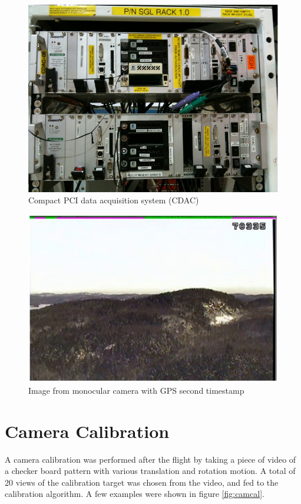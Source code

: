 \begin{figure}[h]
  \centering
  \includegraphics[width=12cm,keepaspectratio=true]{./Figures/CDAC_Rack.jpg}
  \caption{Compact PCI data acquisition system (CDAC)}
  \label{fig:CDAC}
\end{figure}

\begin{figure}[h]
  \centering
  \includegraphics[width=12cm,keepaspectratio=true]{./Figures/video_snapshot.jpg}
  \caption{Image from monocular camera with GPS second timestamp}
  \label{fig:video_snapshot}
\end{figure}

\FloatBarrier

\section{Camera Calibration}

A camera calibration was performed after the flight by taking a piece
of video of a checker board pattern with various translation and
rotation motion. A total of 20 views of the calibration target was
chosen from the video, and fed to the calibration algorithm. A few
examples were shown in figure \ref{fig:camcal}.


